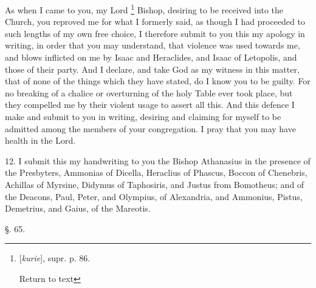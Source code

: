 As when I came to you, my Lord \footnote{[\emph{kurie}], supr. p. 86.

Return to text} Bishop, desiring to be received into the Church, you reproved
me for what I formerly said, as though I had proceeded to such lengths
of my own free choice, I therefore submit to you this my apology in
writing, in order that you may understand, that violence was used
towards me, and blows inflicted on me by Isaac and Heraclides, and
Isaac of Letopolis, and those of their party. And I declare, and take
God as my witness in this matter, that of none of the things which
they have stated, do I know you to be guilty. For no breaking of a
chalice or overturning of the holy Table ever took place, but they
compelled me by their violent usage to assert all this. And this
defence I make and submit to you in writing, desiring and claiming for
myself to be admitted among the members of your congregation. I pray
that you may have health in the Lord.

12. I submit this my handwriting to you the
Bishop Athanasius in the presence of the Presbyters, Ammonias of
Dicella, Heraclius of Phascus, Boccon of Chenebris, Achillas of
Myrsine, Didymus of Taphosiris, and Justus from Bomotheus; and of the
Deacons, Paul, Peter, and Olympius, of Alexandria, and Ammonius,
Pistus, Demetrius, and Gaius, of the Mareotis.

§. 65.

